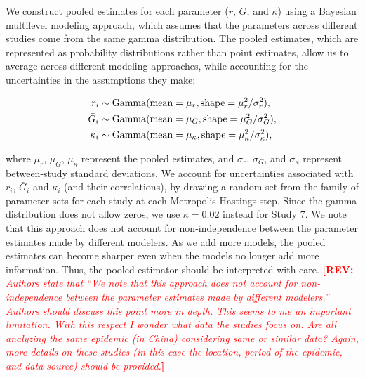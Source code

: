 \documentclass[12pt]{article}
\newcommand{\comment}[3]{\textcolor{#1}{\textbf{[#2: }\textsl{#3}\textbf{]}}}
\newcommand{\rev}[1]{\comment{red}{REV}{#1}}
\begin{document}
We construct pooled estimates for each parameter ($r$, $\bar G$, and $\kappa$) using a Bayesian multilevel modeling approach, which assumes that the parameters across different studies come from the same gamma distribution.
The pooled estimates, which are represented as probability distributions rather than point estimates, allow us to average across different modeling approaches, while accounting for the uncertainties in the assumptions they make:
\begin{linenomath*}
\begin{equation}
\begin{aligned}
r_i &\sim \mathrm{Gamma}(\mathrm{mean}=\mu_r, \mathrm{shape}=\mu_r^2/\sigma_r^2),\\
\bar{G}_i &\sim \mathrm{Gamma}(\mathrm{mean}=\mu_G, \mathrm{shape}=\mu_G^2/\sigma_G^2),\\
\kappa_i &\sim \mathrm{Gamma}(\mathrm{mean}=\mu_\kappa, \mathrm{shape}=\mu_\kappa^2/\sigma_\kappa^2),\\
\end{aligned}
\end{equation}
\end{linenomath*}
where $\mu_r$, $\mu_G$, $\mu_\kappa$ represent the pooled estimates, and $\sigma_r$, $\sigma_G$, and $\sigma_\kappa$ represent between-study standard deviations.
We account for uncertainties associated with $r_i$, $\bar G_i$ and $\kappa_i$ (and their correlations), by drawing a random set from the family of parameter sets for each study at each Metropolis-Hastings step.
Since the gamma distribution does not allow zeros, we use $\kappa=0.02$ instead for Study 7.
We note that this approach does not account for non-independence between the parameter estimates made by different modelers.
As we add more models, the pooled estimates can become sharper even when the models no longer add more information.
Thus, the pooled estimator should be interpreted with care.
\rev{Authors state that “We note that this approach does not account for non- independence between the parameter estimates made by different modelers.” Authors should discuss this point more in depth. This seems to me an important limitation. With this respect I wonder what data the studies focus on. Are all analyzing the same epidemic (in China) considering same or similar data? Again, more details on these studies (in this case the location, period of the epidemic, and data source) should be provided.}
\end{document}

